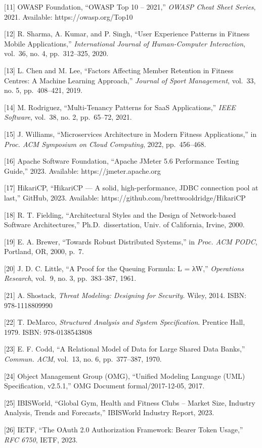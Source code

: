 {[}11{]} OWASP Foundation, ``OWASP Top 10 -- 2021,'' \emph{OWASP Cheat
Sheet Series}, 2021. Available: https://owasp.org/Top10

{[}12{]} R. Sharma, A. Kumar, and P. Singh, ``User Experience Patterns
in Fitness Mobile Applications,'' \emph{International Journal of
Human-Computer Interaction}, vol.~36, no. 4, pp.~312--325, 2020.

{[}13{]} L. Chen and M. Lee, ``Factors Affecting Member Retention in
Fitness Centres: A Machine Learning Approach,'' \emph{Journal of Sport
Management}, vol.~33, no. 5, pp.~408--421, 2019.

{[}14{]} M. Rodriguez, ``Multi-Tenancy Patterns for SaaS Applications,''
\emph{IEEE Software}, vol.~38, no. 2, pp.~65--72, 2021.

{[}15{]} J. Williams, ``Microservices Architecture in Modern Fitness
Applications,'' in \emph{Proc. ACM Symposium on Cloud Computing}, 2022,
pp.~456--468.

{[}16{]} Apache Software Foundation, ``Apache JMeter 5.6 Performance
Testing Guide,'' 2023. Available: https://jmeter.apache.org

{[}17{]} HikariCP, ``HikariCP --- A solid, high-performance, JDBC
connection pool at last,'' GitHub, 2023. Available:
https://github.com/brettwooldridge/HikariCP

{[}18{]} R. T. Fielding, ``Architectural Styles and the Design of
Network-based Software Architectures,'' Ph.D.~dissertation, Univ. of
California, Irvine, 2000.

{[}19{]} E. A. Brewer, ``Towards Robust Distributed Systems,'' in
\emph{Proc. ACM PODC}, Portland, OR, 2000, p.~7.

{[}20{]} J. D. C. Little, ``A Proof for the Queuing Formula: L = λW,''
\emph{Operations Research}, vol.~9, no. 3, pp.~383--387, 1961.

{[}21{]} A. Shostack, \emph{Threat Modeling: Designing for Security}.
Wiley, 2014. ISBN: 978-1118809990

{[}22{]} T. DeMarco, \emph{Structured Analysis and System
Specification}. Prentice Hall, 1979. ISBN: 978-0138543808

{[}23{]} E. F. Codd, ``A Relational Model of Data for Large Shared Data
Banks,'' \emph{Commun. ACM}, vol.~13, no. 6, pp.~377--387, 1970.

{[}24{]} Object Management Group (OMG), ``Unified Modeling Language
(UML) Specification, v2.5.1,'' OMG Document formal/2017-12-05, 2017.

{[}25{]} IBISWorld, ``Global Gym, Health and Fitness Clubs -- Market
Size, Industry Analysis, Trends and Forecasts,'' IBISWorld Industry
Report, 2023.

{[}26{]} IETF, ``The OAuth 2.0 Authorization Framework: Bearer Token
Usage,'' \emph{RFC 6750}, IETF, 2023.
